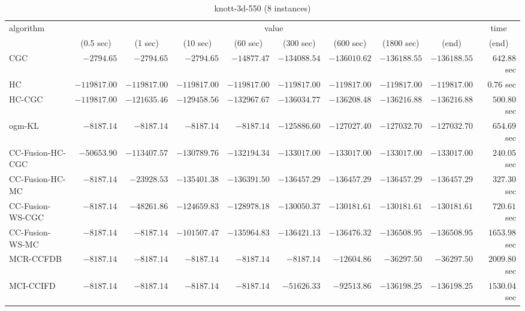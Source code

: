 \begin{table}[H]
\scriptsize
\centering
\caption{knott-3d-550 (8 instances)}
\label{tab:anytimetable-knott-3d-550}
\begin{tabular}{lrrrrrrrrr}
\toprule
           algorithm &                                   \multicolumn{8}{c}{value} & \multicolumn{1}{c}{time}   \\  
\cmidrule(lr){2-9}\cmidrule(lr){10-10}   
                     & \multicolumn{1}{c}{(0.5 sec)} & \multicolumn{1}{c}{(1 sec)} & \multicolumn{1}{c}{(10 sec)} & \multicolumn{1}{c}{(60 sec)} & \multicolumn{1}{c}{(300 sec)} & \multicolumn{1}{c}{(600 sec)} & \multicolumn{1}{c}{(1800 sec)} & \multicolumn{1}{c}{(end)} & \multicolumn{1}{c}{(end)}   \\ \midrule 
                 CGC & $     -2794.65$ & $     -2794.65$ & $     -2794.65$ & $    -14877.47$ & $   -134088.54$ & $   -136010.62$ & $   -136188.55$ & $   -136188.55$ & $       642.88$ sec   \\ 
                  HC & $   -119817.00$ & $   -119817.00$ & $   -119817.00$ & $   -119817.00$ & $   -119817.00$ & $   -119817.00$ & $   -119817.00$ & $   -119817.00$ & $         0.76$ sec   \\ 
              HC-CGC & $   -119817.00$ & $   -121635.46$ & $   -129458.56$ & $   -132967.67$ & $   -136034.77$ & $   -136208.48$ & $   -136216.88$ & $   -136216.88$ & $       500.80$ sec   \\ 
              ogm-KL & $     -8187.14$ & $     -8187.14$ & $     -8187.14$ & $     -8187.14$ & $   -125886.60$ & $   -127027.40$ & $   -127032.70$ & $   -127032.70$ & $       654.69$ sec   \\ 
    CC-Fusion-HC-CGC & $    -50653.90$ & $   -113407.57$ & $   -130789.76$ & $   -132194.34$ & $   -133017.00$ & $   -133017.00$ & $   -133017.00$ & $   -133017.00$ & $       240.05$ sec   \\ 
     CC-Fusion-HC-MC & $     -8187.14$ & $    -23928.53$ & $   -135401.38$ & $   -136391.50$ & $   -136457.29$ & $   -136457.29$ & $   -136457.29$ & $   -136457.29$ & $       327.30$ sec   \\ 
    CC-Fusion-WS-CGC & $     -8187.14$ & $    -48261.86$ & $   -124659.83$ & $   -128978.18$ & $   -130050.37$ & $   -130181.61$ & $   -130181.61$ & $   -130181.61$ & $       720.61$ sec   \\ 
     CC-Fusion-WS-MC & $     -8187.14$ & $     -8187.14$ & $   -101507.47$ & $   -135964.83$ & $   -136421.13$ & $   -136476.32$ & $   -136508.95$ & $   -136508.95$ & $      1653.98$ sec   \\ 
\cmidrule{1-1} 
           MCR-CCFDB & $     -8187.14$ & $     -8187.14$ & $     -8187.14$ & $     -8187.14$ & $     -8187.14$ & $    -12604.86$ & $    -36297.50$ & $    -36297.50$ & $      2009.80$ sec   \\ 
\cmidrule{1-1} 
           MCI-CCIFD & $     -8187.14$ & $     -8187.14$ & $     -8187.14$ & $     -8187.14$ & $    -51626.33$ & $    -92513.86$ & $   -136198.25$ & $   -136198.25$ & $      1530.04$ sec   \\ 
\bottomrule
\end{tabular}
\end{table}